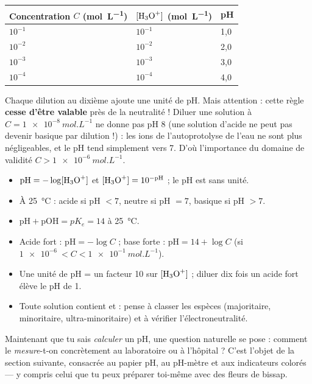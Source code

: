 \documentclass[11pt]{article}
\begin{document}
\begin{exemplebox}
\begin{center}
\begin{tabularx}{\linewidth}{|l|X|X|}
\hline
\rowcolor{popblueL} Concentration $C$ (\si{mol.L^{-1}}) & $[\ce{H3O+}]$ (\si{mol.L^{-1}}) & pH \\
\hline
$10^{-1}$ & $10^{-1}$ & 1,0 \\
\hline
$10^{-2}$ & $10^{-2}$ & 2,0 \\
\hline
$10^{-3}$ & $10^{-3}$ & 3,0 \\
\hline
$10^{-4}$ & $10^{-4}$ & 4,0 \\
\hline
\end{tabularx}
\end{center}
Chaque dilution au dixième ajoute une unité de pH. Mais attention : cette règle \textbf{cesse d'être valable} près de la neutralité ! Diluer une solution à $C = \SI{1e-8}{mol.L^{-1}}$ ne donne pas pH 8 (une solution d'acide ne peut pas devenir basique par dilution !) : les ions  de l'autoprotolyse de l'eau ne sont plus négligeables, et le pH tend simplement vers 7. D'où l'importance du domaine de validité $C > \SI{1e-6}{mol.L^{-1}}$.
\end{exemplebox}

\begin{aretenir}
\begin{itemize}
\item $\mathrm{pH} = -\log[\ce{H3O+}]$ et $[\ce{H3O+}] = 10^{-\mathrm{pH}}$ ; le pH est sans unité.
\item À \SI{25}{\celsius} : acide si pH $< 7$, neutre si pH $= 7$, basique si pH $> 7$.
\item $\mathrm{pH} + \mathrm{pOH} = pK_e = 14$ à \SI{25}{\celsius}.
\item Acide fort : $\mathrm{pH} = -\log C$ ; base forte : $\mathrm{pH} = 14 + \log C$ (si $\SI{1e-6}{} < C < \SI{1e-1}{mol.L^{-1}}$).
\item Une unité de pH = un facteur 10 sur $[\ce{H3O+}]$ ; diluer dix fois un acide fort élève le pH de 1.
\item Toute solution contient  et  : pense à classer les espèces (majoritaire, minoritaire, ultra-minoritaire) et à vérifier l'électroneutralité.
\end{itemize}
\end{aretenir}

Maintenant que tu sais \emph{calculer} un pH, une question naturelle se pose : comment le \emph{mesure}-t-on concrètement au laboratoire ou à l'hôpital ? C'est l'objet de la section suivante, consacrée au papier pH, au pH-mètre et aux indicateurs colorés — y compris celui que tu peux préparer toi-même avec des fleurs de bissap.
\end{document}
